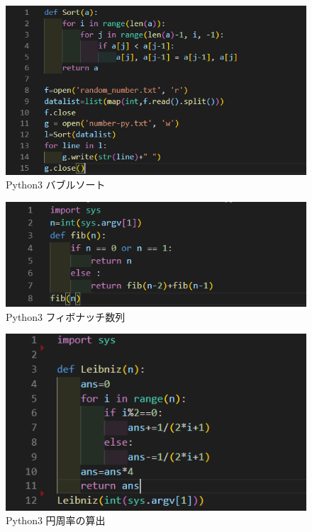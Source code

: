 \begin{figure}[tb]
    \centering
    \includegraphics[width=13.5cm,keepaspectratio]{figure/b-rb.PNG}
    \caption{Python3 バブルソート}
    \label{fig:b-rb}
\end{figure}

\begin{figure}[tb]
    \centering
    \includegraphics[width=13.5cm,keepaspectratio]{figure/f-py.PNG}
    \caption{Python3 フィボナッチ数列}
    \label{fig:f-py}
\end{figure}

\begin{figure}[tb]
    \centering
    \includegraphics[width=13.5cm,keepaspectratio]{figure/p-py.PNG}
    \caption{Python3 円周率の算出}
    \label{fig:p-py}
\end{figure}

